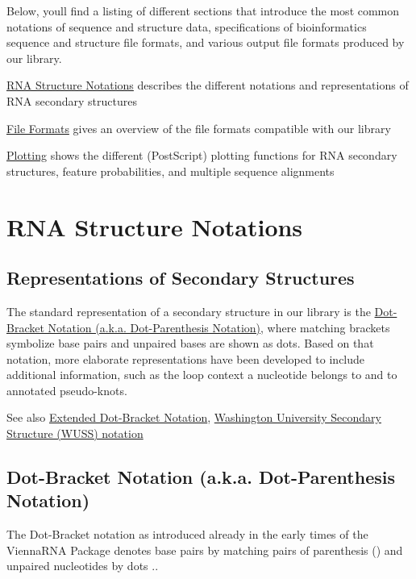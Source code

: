 Below, you\textquotesingle{}ll find a listing of different sections that introduce the most common notations of sequence and structure data, specifications of bioinformatics sequence and structure file formats, and various output file formats produced by our library.


\begin{DoxyItemize}
\item \hyperlink{rna_structure_notations}{R\+NA Structure Notations} describes the different notations and representations of R\+NA secondary structures
\item \hyperlink{file_formats}{File Formats} gives an overview of the file formats compatible with our library
\item \hyperlink{plots}{Plotting} shows the different (Post\+Script) plotting functions for R\+NA secondary structures, feature probabilities, and multiple sequence alignments 
\end{DoxyItemize}\hypertarget{rna_structure_notations}{}\section{R\+NA Structure Notations}\label{rna_structure_notations}
\hypertarget{rna_structure_notations_sec_structure_representations}{}\subsection{Representations of Secondary Structures}\label{rna_structure_notations_sec_structure_representations}
The standard representation of a secondary structure in our library is the \hyperlink{rna_structure_notations_dot-bracket-notation}{Dot-\/\+Bracket Notation (a.\+k.\+a. Dot-\/\+Parenthesis Notation)}, where matching brackets symbolize base pairs and unpaired bases are shown as dots. Based on that notation, more elaborate representations have been developed to include additional information, such as the loop context a nucleotide belongs to and to annotated pseudo-\/knots.

\begin{DoxySeeAlso}{See also}
\hyperlink{rna_structure_notations_dot-bracket-ext-notation}{Extended Dot-\/\+Bracket Notation}, \hyperlink{rna_structure_notations_wuss-notation}{Washington University Secondary Structure (W\+U\+SS) notation}
\end{DoxySeeAlso}
\hypertarget{rna_structure_notations_dot-bracket-notation}{}\subsection{Dot-\/\+Bracket Notation (a.\+k.\+a. Dot-\/\+Parenthesis Notation)}\label{rna_structure_notations_dot-bracket-notation}
The Dot-\/\+Bracket notation as introduced already in the early times of the Vienna\+R\+NA Package denotes base pairs by matching pairs of parenthesis {\ttfamily ()} and unpaired nucleotides by dots {\ttfamily .}.

